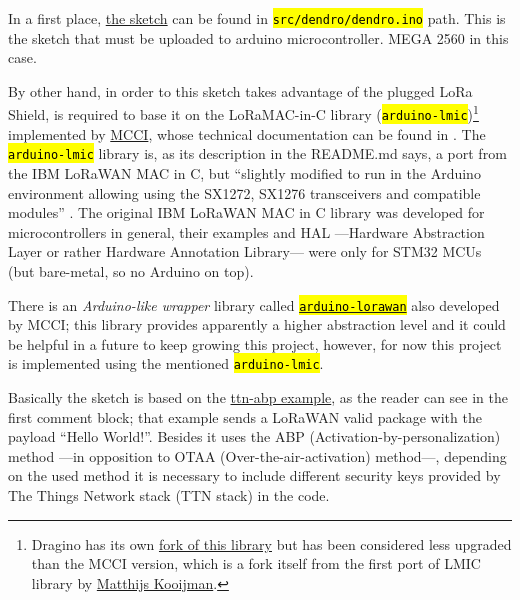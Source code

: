 \documentclass[11pt,a4paper,dvipsnames,twoside]{article}
\newcounter{subsubsubsection}[subsubsection]
\newcommand{\cmd}[1] {\hl{\texttt{#1}}}
\begin{document}
In a first place, \href{https://github.com/WyRe/lora-arduino-dendrometer/blob/master/src/arduino/dendro/dendro.ino}{the sketch} can be found in \cmd{src/dendro/dendro.ino} path. This is the sketch that must be uploaded to arduino microcontroller. MEGA 2560 in this case.

By other hand, in order to this sketch takes advantage of the plugged LoRa Shield, is required to base it on the LoRaMAC-in-C library \cite{MCCI_lmic} (\cmd{arduino-lmic})\footnote{Dragino has its own \href{https://github.com/dragino/arduino-lmic}{fork of this library} but has been considered less upgraded than the MCCI version, which is a fork itself from the first port of LMIC library by \href{https://github.com/matthijskooijman}{Matthijs Kooijman}.} implemented by \href{https://mcci.com/}{MCCI}, whose technical documentation can be found in \cite{MCCI_lmic_docs}. The \cmd{arduino-lmic} library is, as its description in the README.md says, a port from the IBM LoRaWAN MAC in C, but \enquote{slightly modified to run in the Arduino environment allowing using the SX1272, SX1276 transceivers and compatible modules} \cite{MCCI_lmic}. The original IBM LoRaWAN MAC in C library was developed for microcontrollers in general, their examples and HAL ---Hardware Abstraction Layer or rather Hardware Annotation Library--- were only for STM32 MCUs (but bare-metal, so no Arduino on top). 

There is an \textit{Arduino-like wrapper} library called \href{https://github.com/mcci-catena/arduino-lorawan}{\cmd{arduino-lorawan}} also developed by MCCI; this library provides apparently a higher abstraction level and it could be helpful in a future to keep growing this project, however, for now this project is implemented using the mentioned \cmd{arduino-lmic}.

Basically the sketch is based on the \href{https://github.com/mcci-catena/arduino-lmic/blob/master/examples/ttn-abp/ttn-abp.ino}{ttn-abp example}, as the reader can see in the first comment block; that example sends a LoRaWAN valid package with the payload \enquote{Hello World!}. Besides it uses the ABP (Activation-by-personalization) method ---in opposition to OTAA (Over-the-air-activation) method---, depending on the used method it is necessary to include different security keys provided by The Things Network stack (TTN stack) in the code. \cite{TTN_Security}
\end{document}
